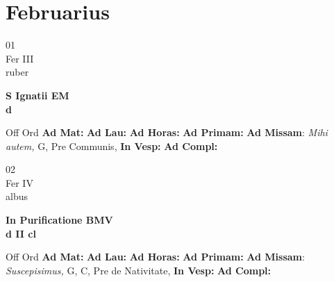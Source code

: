 \documentclass[10pt, openany]{book}
\begin{document}
        \chapter{Februarius}
                        
        \begin{center}
            \begin{minipage}{3.5in}
                \vspace{2em}
                \begin{minipage}{0.5in}
                    {\Huge 01} \\
                    {\normalsize Fer III} \\
                    {\normalsize ruber}
                \end{minipage}
                \begin{minipage}{3.0in}
                    \textbf{ \large S Ignatii EM \\
                    \textnormal{\normalsize d}} \\ 
                \end{minipage}
                \begin{justify}Off Ord
                    \textbf{Ad Mat: }
                    \textbf{Ad Lau: }
                    \textbf{Ad Horas: }
                    \textbf{Ad Primam: }\textbf{Ad Missam}: \textit{Mihi autem,} G, Pre Communis,  
                    \textbf{In Vesp: }
                    \textbf{Ad Compl: }
                \end{justify}
            \end{minipage}
        \end{center}
    
        \begin{center}
            \begin{minipage}{3.5in}
                \vspace{2em}
                \begin{minipage}{0.5in}
                    {\Huge 02} \\
                    {\normalsize Fer IV} \\
                    {\normalsize albus}
                \end{minipage}
                \begin{minipage}{3.0in}
                    \textbf{ \large In Purificatione BMV \\
                    \textnormal{\normalsize d II cl}} \\ 
                \end{minipage}
                \begin{justify}Off Ord
                    \textbf{Ad Mat: }
                    \textbf{Ad Lau: }
                    \textbf{Ad Horas: }
                    \textbf{Ad Primam: }\textbf{Ad Missam}: \textit{Suscepisimus,} G, C, Pre de Nativitate,  
                    \textbf{In Vesp: }
                    \textbf{Ad Compl: }
                \end{justify}
            \end{minipage}
        \end{center}
    
\end{document}
